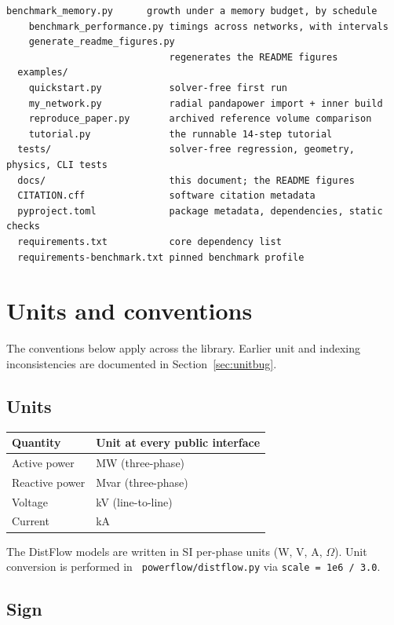 \documentclass[11pt,a4paper]{report}
\newcommand{\code}[1]{\texttt{\small #1}}
\newcommand{\pymod}[1]{\texttt{\small\color{nbblue} #1}}
\begin{document}
\begin{lstlisting}[style=sh,basicstyle=\ttfamily\scriptsize]
    benchmark_memory.py      growth under a memory budget, by schedule
    benchmark_performance.py timings across networks, with intervals
    generate_readme_figures.py
                             regenerates the README figures
  examples/
    quickstart.py            solver-free first run
    my_network.py            radial pandapower import + inner build
    reproduce_paper.py       archived reference volume comparison
    tutorial.py              the runnable 14-step tutorial
  tests/                     solver-free regression, geometry, physics, CLI tests
  docs/                      this document; the README figures
  CITATION.cff               software citation metadata
  pyproject.toml             package metadata, dependencies, static checks
  requirements.txt           core dependency list
  requirements-benchmark.txt pinned benchmark profile
\end{lstlisting}

\chapter{Units and conventions}
\label{ch:conventions}

The conventions below apply across the library. Earlier unit and indexing
inconsistencies are documented in Section~\ref{sec:unitbug}.

\section{Units}

\begin{center}
\begin{tabular}{@{}ll@{}}
\toprule
Quantity & Unit at every public interface \\
\midrule
Active power & MW (three-phase) \\
Reactive power & Mvar (three-phase) \\
Voltage & kV (line-to-line) \\
Current & kA \\
\bottomrule
\end{tabular}
\end{center}

The DistFlow models are written in SI per-phase units (W, V, A, $\Omega$).
Unit conversion is performed in \pymod{powerflow/distflow.py} via
\code{scale = 1e6 / 3.0}.

\section{Sign}
\end{document}
